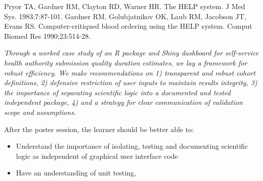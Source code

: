 \documentclass{amia}
\begin{document}
\makeatletter
\renewcommand{\@biblabel}[1]{\hfill #1.}
\makeatother




\begin{thebibliography}{1}
\setlength\itemsep{-0.1em}

Pryor TA, Gardner RM, Clayton RD, Warner HR. The HELP system. J Med Sys. 1983;7:87-101.
Gardner RM, Golubjatnikov OK, Laub RM, Jacobson JT, Evans RS. Computer-critiqued blood ordering using the HELP system. Comput Biomed Res 1990;23:514-28.



\end{thebibliography}


\textit{Through a worked case study of an R package and Shiny dashboard for self-service health authority submission quality duration estimates, we lay a framework for robust efficiency. We make recommendations on 1) transparent and robust cohort definitions, 2) defensive restriction of user inputs to maintain results integrity, 3) the importance of separating scientific logic into a documented and tested independent package, 4) and a strategy for clear communication of validation scope and assumptions.}

After the poster session, the learner should be better able to:

\begin{itemize}
  \item Understand the importance of isolating, testing and documenting scientific logic as independent of graphical user interface code
  \item Have an understanding of unit testing, 
\end{itemize}
\end{document}

